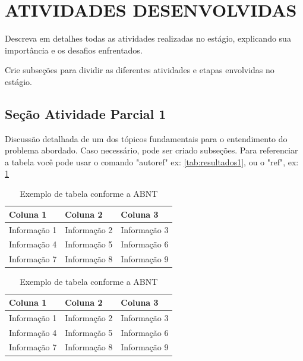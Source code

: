 \section{ATIVIDADES DESENVOLVIDAS} \label{ch:atividades-desenvolvidas}
Descreva em detalhes todas as atividades realizadas no estágio, explicando sua importância e os desafios enfrentados.

Crie subseções para dividir as diferentes atividades e etapas  envolvidas no estágio.

\subsection{ Seção Atividade Parcial 1} \label{sec:definir-tituto-da-secao1}

Discussão detalhada de um dos tópicos fundamentais para o entendimento do problema abordado. Caso necessário, pode ser criado subseções. Para referenciar a tabela você pode usar o comando "autoref" ex: \autoref{tab:resultados1}, ou o "ref", ex: \ref{tab:resultados1}

\begin{table}[htb]
\centering
\caption{Exemplo de tabela conforme a ABNT}
\label{tab:resultados1}
\begin{tabular}{p{} p{} p{}} %
    \hline
    \textbf{Coluna 1} & \textbf{Coluna 2} & \textbf{Coluna 3} \\
    \hline
    Informação 1 & Informação 2 & Informação 3 \\
    Informação 4 & Informação 5 & Informação 6 \\
    Informação 7 & Informação 8 & Informação 9 \\  
    \hline
\end{tabular}
\end{table}

\begin{table}[htb]
\centering
\caption{Exemplo de tabela conforme a ABNT}
\label{tab:resultados2}
\begin{tabular}{>{\centering\arraybackslash}p{}  >{\centering\arraybackslash}p{}  >{\centering\arraybackslash}p{}} %
    \hline
    \textbf{Coluna 1} & \textbf{Coluna 2} & \textbf{Coluna 3} \\
    \hline
    Informação 1 & Informação 2 & Informação 3 \\
    Informação 4 & Informação 5 & Informação 6 \\
    Informação 7 & Informação 8 & Informação 9 \\  
    \hline
\end{tabular}
\end{table}


